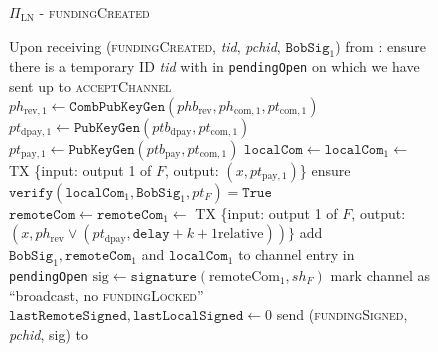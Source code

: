 \begin{figure}[!htbp]
\begin{protocolbox}{$\Pi_{\mathrm{LN}}$ - \textsc{fundingCreated}}
  \begin{algorithmic}[1]
    \State Upon receiving (\textsc{fundingCreated}, \textit{tid},
    \textit{pchid}, $\mathtt{BobSig}_1$) from \bob:
    \Indent
      \State ensure there is a temporary ID \textit{tid} with \bob{} in
      \texttt{pendingOpen} on which we have sent up to \textsc{acceptChannel}
      \State $ph_{\mathrm{rev}, 1} \gets
      \mathtt{CombPubKeyGen}\left(phb_{\mathrm{rev}}, ph_{\mathrm{com}, 1},
      pt_{\mathrm{com}, 1}\right)$
      \State $pt_{\mathrm{dpay}, 1} \gets
      \texttt{PubKeyGen}\left(ptb_{\mathrm{dpay}}, pt_{\mathrm{com}, 1}\right)$
      \State $pt_{\mathrm{pay}, 1} \gets
      \texttt{PubKeyGen}\left(ptb_{\mathrm{pay}}, pt_{\mathrm{com}, 1}\right)$
      \State $\mathtt{localCom} \gets \mathtt{localCom}_1 \gets$ TX \{input:
      output 1 of $F$, output: $\left(x, pt_{\mathrm{pay}, 1}\right)$\}
      \State ensure $\mathtt{verify}\left(\mathtt{localCom}_1,
      \mathtt{BobSig}_1, pt_F\right) = \mathtt{True}$
      \State $\mathtt{remoteCom} \gets \mathtt{remoteCom}_1 \gets$ TX \{input:
      output 1 of $F$, output: $\left(x, ph_{\mathrm{rev}} \vee
      \left(pt_{\mathrm{dpay}}, \mathtt{delay} + k + 1 \text{
      relative}\right)\right)\}$
      \State add $\mathtt{BobSig}_1, \mathtt{remoteCom}_1$ and
      $\mathtt{localCom}_1$ to channel entry in \texttt{pendingOpen}
      \State $\mathrm{sig} \gets \mathtt{signature}\left(\mathrm{remoteCom}_1,
      sh_F\right)$
      \State mark channel as ``broadcast, no \textsc{fundingLocked}''
      \State $\mathtt{lastRemoteSigned}, \mathtt{lastLocalSigned} \gets 0$
      \State send (\textsc{fundingSigned}, \textit{pchid}, sig) to \bob{}
    \EndIndent
  \end{algorithmic}
\end{protocolbox}
\caption{}
\label{alg:protocol:open:fundingCreated}
\end{figure}

